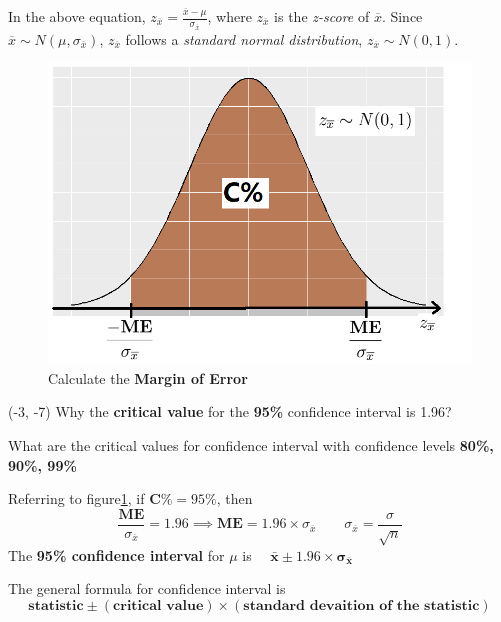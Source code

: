 \documentclass[a4paper, 12pt,twoside]{book}
\begin{document}
\begin{itemize}
       In the above equation, $\displaystyle{z_{\overline{x}} = \frac{\overline{x}-\mu}{\sigma_{\overline{x}}}}$, where $z_{\overline{x}}$ is the \textit{z-score} of $\overline{x}$. Since $\overline{x} \sim N(\mu, \sigma_{\bar{x}})$, $z_{\overline{x}}$ follows a \textit{standard normal distribution}, $z_{\overline{x}} \sim N(0, 1)$. 
     \begin{figure}[H]
         \centering
         \includegraphics[scale=0.6]{ME}
         \caption{Calculate the \textbf{Margin of Error}}
         \label{ME}
     \end{figure}
           \begin{textblock}{4.8}(-3, -7)
      Why the \textbf{critical value} for the \textbf{95\%} confidence interval is 1.96?\vspace{0.3cm}
      
      What are the critical values for confidence interval with confidence levels \textbf{80\%, 90\%, 99\%}
      \end{textblock}
   Referring to figure\ref{ME}, if $\textbf{C\%} = 95\%$, then
      $$\frac{\textbf{ME}}{\sigma_{\overline{x}}}= 1.96 \implies \textbf{ME} = 1.96 \times \sigma_{\overline{x}} \qquad \sigma_{\overline{x}} = \frac{\sigma}{\sqrt{n}}$$ 
      The \textbf{95\% confidence interval} for $\mu$ is $\mathbf{\quad\bar{x} \pm 1.96\times \sigma_{\overline{x}}}$
      
      \colorbox{babypink}{\parbox{\textwidth}{
      The general formula for confidence interval is 
      $$\textbf{statistic} \pm (\textbf{critical value})\times (\textbf{standard devaition of the statistic})$$
  }}\vspace{0.6cm}
  

\end{itemize}
\end{document}
